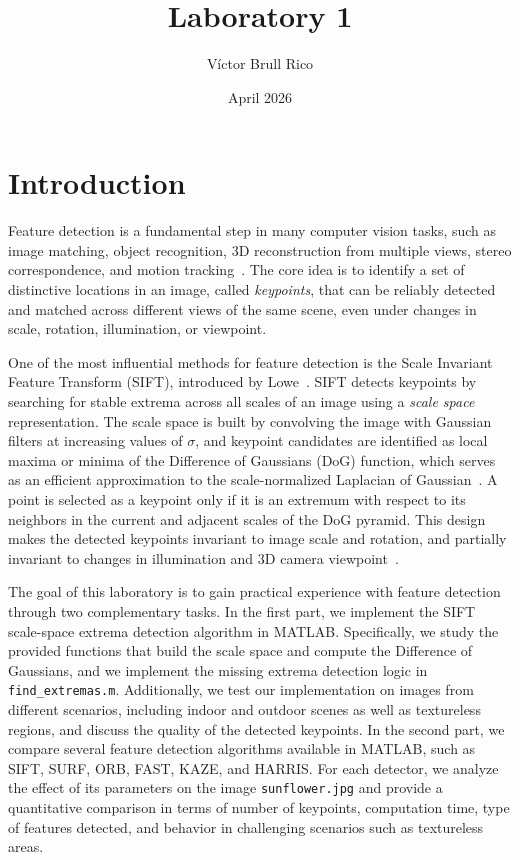 \documentclass{article}
\title{Laboratory 1}
\author{Víctor Brull Rico}
\date{April 2026}
\begin{document}
\maketitle

\section{Introduction}

Feature detection is a fundamental step in many computer vision tasks, such as 
image matching, object recognition, 3D reconstruction from multiple views, stereo 
correspondence, and motion tracking~\cite{Lowe2004}. The core idea is to identify 
a set of distinctive locations in an image, called \textit{keypoints}, that can be 
reliably detected and matched across different views of the same scene, even under 
changes in scale, rotation, illumination, or viewpoint.

One of the most influential methods for feature detection is the Scale Invariant 
Feature Transform (SIFT), introduced by Lowe~\cite{Lowe2004}. SIFT detects keypoints 
by searching for stable extrema across all scales of an image using a 
\textit{scale space} representation. The scale space is built by convolving the 
image with Gaussian filters at increasing values of $\sigma$, and keypoint 
candidates are identified as local maxima or minima of the Difference of Gaussians 
(DoG) function, which serves as an efficient approximation to the 
scale-normalized Laplacian of Gaussian~\cite{Lowe2004}. A point is selected as a 
keypoint only if it is an extremum with respect to its neighbors in the 
current and adjacent scales of the DoG pyramid. This design makes the detected 
keypoints invariant to image scale and rotation, and partially invariant to 
changes in illumination and 3D camera viewpoint~\cite{Lowe2004}.

The goal of this laboratory is to gain practical experience with feature detection 
through two complementary tasks. In the first part, we implement the SIFT 
scale-space extrema detection algorithm in MATLAB. Specifically, we 
study the provided functions that build the scale space and compute the Difference 
of Gaussians, and we implement the missing extrema detection logic in 
\texttt{find\_extremas.m}. Additionally, we test our implementation on images from different 
scenarios, including indoor and outdoor scenes as well as textureless regions, and 
discuss the quality of the detected keypoints. In the second part, we compare several feature detection 
algorithms available in MATLAB, such as SIFT, SURF, ORB, FAST, KAZE, and HARRIS. 
For each detector, we analyze the effect of its parameters on the image 
\texttt{sunflower.jpg} and provide a quantitative comparison in terms of number 
of keypoints, computation time, type of features detected, and behavior in 
challenging scenarios such as textureless areas.
\end{document}
